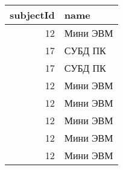 \begin{tabular}{rl}
\toprule
subjectId & name \\
\midrule
12 & Мини ЭВМ \\
17 & СУБД ПК \\
17 & СУБД ПК \\
12 & Мини ЭВМ \\
12 & Мини ЭВМ \\
12 & Мини ЭВМ \\
12 & Мини ЭВМ \\
12 & Мини ЭВМ \\
\bottomrule
\end{tabular}
